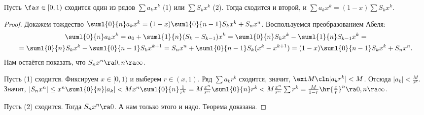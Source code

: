 \documentclass[a4paper]{article}
\begin{document}
\begin{theorem}
Пусть $\fa x \in [0,1)$ сходится один из рядов $\sum a_kx^k$ (1) или $\sum S_kx^k$ (2). Тогда сходится и второй, и
$\sum a_k x^k = (1-x)\sum S_k x^k$.
\end{theorem}
\begin{proof}
Докажем тождество $\suml{0}{n} a_kx^k=(1-x)\suml{0}{n-1}S_kx^k + S_nx^n$. Воспользуемся преобразованием Абеля:
\begin{multline*}
\suml{0}{n} a_kx^k = a_0+\suml{1}{n}(S_k-S_{k-1})x^k=\suml{0}{n}S_kx^k-\suml{1}{n}S_{k-1}x^k=\\=
\suml{0}{n}S_kx^k-\suml{0}{n-1}S_kx^{k+1}=S_nx^n + \suml{0}{n-1}S_k(x^k-x^{k+1})=(1-x)\suml{0}{n-1}S_kx^k + S_nx^n.
\end{multline*}
Нам остаётся показать, что $S_nx^n \ra 0, n \ra \infty$.

 Пусть (1) сходится. Фиксируем $x \in [0,1)$ и выберем $r\in(x,1)$. Ряд
$\sum a_kr^k$ сходится, значит, $\exi M\cln |a_kr^k|< M$. Отсюда $|a_k| < \frac{M}{r^k}$.
Значит, $|S_nx^n| \le x^n\suml{0}{n}|a_k| < Mx^n\suml{0}{n}\frac{1}{r^k}=M\frac{x^n}{r^n}\suml{0}{n}r^k<M
\frac{x^n}{r^n}\sum r^k = \frac{M}{1-r}\hr{\frac{x}{r}}^n \ra 0, n \ra \infty$.

 Пусть (2) сходится. Тогда $S_nx^n \ra 0$. А нам только этого и надо. Теорема доказана.
\end{proof}
\end{document}
